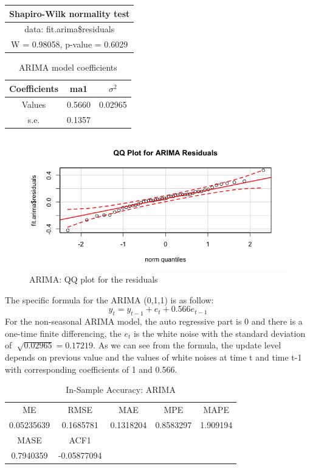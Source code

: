 \documentclass[journal, a4paper]{IEEEtran}
\begin{document}
\begin{table}[H]
\centering
\begin{tabular}{|c|}
\hline
Shapiro-Wilk normality test   \\ \hline
data:  fit.arima\$residuals \\  \hline
W = 0.98058, p-value = 0.6029  \\
\hline
\end{tabular}
\end{table}
\begin{table}[H]
\caption{ARIMA model coefficients}
\label{table:arima_coefficient}
\centering
\begin{tabular}{|c|c|c|}
\hline
Coefficients & ma1 &$\sigma^2$\\ \hline
Values & 0.5660 &0.02965\\ \hline
s.e. & 0.1357 \\
\hline
\end{tabular}
\end{table}
\begin{figure}[H]
\begin{center}
\includegraphics[scale=0.35]{fig2/can_qqplot.png}
\caption{ARIMA: QQ plot for the residuals}
\label{fig2:qqplot}
\end{center}
\end{figure}
The specific formula for the ARIMA (0,1,1) is as follow:
$$y_{t}=y_{t-1}+e_{t}+0.566e_{t-1}$$
For the non-seasonal ARIMA model,
the auto regressive part is 0 and there is a one-time finite differencing, the $e_t$ is the white noise with the standard deviation of $\sqrt[]{0.02965}=0.17219$. As we can see from the formula, the update level depends on previous value and the values of white noises at time t and time t-1 with corresponding coefficients of 1 and 0.566.

\begin{table}[H]
\caption{In-Sample Accuracy: ARIMA}
\label{table:can_arima_accuracy}
\centering
\begin{tabular}{|c|c|c|c|c|}
\hline
 ME       & RMSE       &  MAE       &  MPE      & MAPE      \\ 
0.05235639 &0.1685781& 0.1318204& 0.8583297& 1.909194   \\ \hline
MASE & ACF1 & ~ & ~ & ~ \\ 
0.7940359 &-0.05877094  & ~ & ~ & ~ \\
\hline
\end{tabular}
\end{table}
\end{document}
